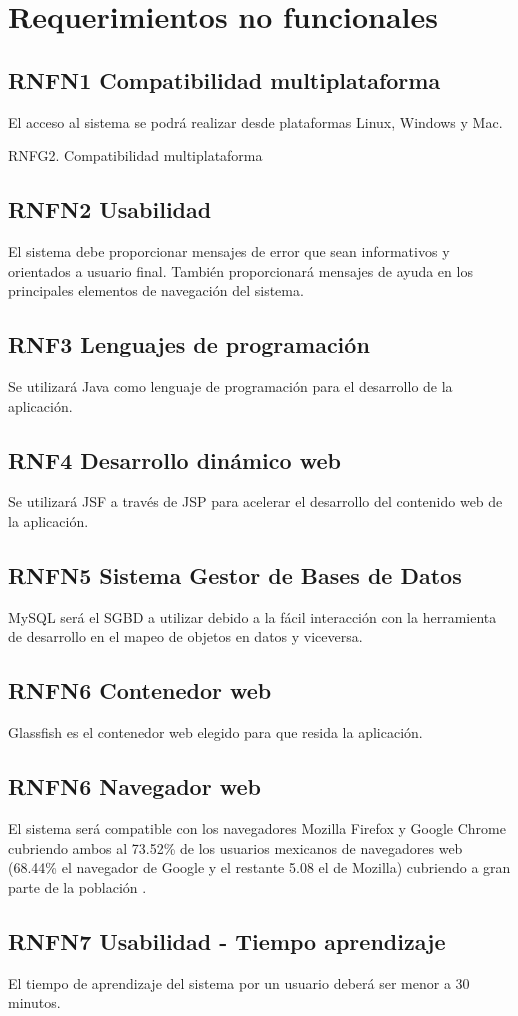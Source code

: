 \section{Requerimientos no funcionales}

    

    \subsection{RNFN1 Compatibilidad multiplataforma}

	   El acceso al sistema se podrá realizar desde plataformas Linux, Windows y Mac.
	   
	  RNFG2. Compatibilidad multiplataforma

\subsection{RNFN2 Usabilidad}
El sistema debe proporcionar mensajes de error que sean informativos y orientados a usuario
final. También proporcionará mensajes de ayuda en los principales elementos de navegación del sistema.

\subsection{RNF3 Lenguajes de programación}
Se utilizará Java como lenguaje de programación para el desarrollo de la aplicación.
\subsection{RNF4 Desarrollo dinámico web}
Se utilizará JSF a través de JSP para acelerar el desarrollo del contenido web de la aplicación.
\subsection{RNFN5 Sistema Gestor de Bases de Datos}
MySQL será el SGBD a utilizar debido a la fácil interacción con la herramienta de desarrollo
en el mapeo de objetos en datos y viceversa.
\subsection{RNFN6 Contenedor web}
Glassfish es el contenedor web elegido para que resida la aplicación.
\subsection{RNFN6 Navegador web}
El sistema será compatible con los navegadores Mozilla Firefox y Google Chrome cubriendo
ambos al 73.52\% \cite{GLOBALStat} de los usuarios mexicanos de navegadores web (68.44\% el navegador
de Google y el restante 5.08 el de Mozilla) cubriendo a gran parte de la población .
\subsection{RNFN7 Usabilidad - Tiempo aprendizaje}
El tiempo de aprendizaje del sistema por un usuario deberá ser menor a 30 minutos.

